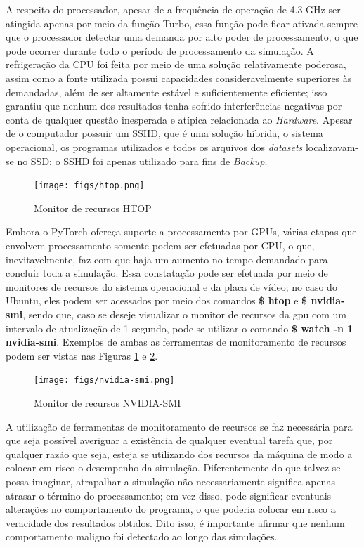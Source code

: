 A respeito do processador, apesar de a frequência de operação de 4.3 GHz ser atingida apenas por meio da função Turbo, essa função pode ficar ativada sempre que o processador detectar uma demanda por alto poder de processamento, o que pode ocorrer durante todo o período de processamento da simulação. A refrigeração da CPU foi feita por meio de uma solução relativamente poderosa, assim como a fonte utilizada possui capacidades consideravelmente superiores às demandadas, além de ser altamente estável e suficientemente eficiente; isso garantiu que nenhum dos resultados tenha sofrido interferências negativas por conta de qualquer questão inesperada e atípica relacionada ao \textit{Hardware}. Apesar de o computador possuir um SSHD, que é uma solução híbrida, o sistema operacional, os programas utilizados e todos os arquivos dos \textit{datasets} localizavam-se no SSD; o SSHD foi apenas utilizado para fins de \textit{Backup}.

\begin{figure}[H]
    \centering
    \texttt{[image: figs/htop.png]}
    \caption{Monitor de recursos HTOP}
    \label{fig:results_htop}
\end{figure}

Embora o PyTorch ofereça suporte a processamento por GPUs, várias etapas que envolvem processamento somente podem ser efetuadas por CPU, o que, inevitavelmente, faz com que haja um aumento no tempo demandado para concluir toda a simulação. Essa constatação pode ser efetuada por meio de monitores de recursos do sistema operacional e da placa de vídeo; no caso do Ubuntu, eles podem ser acessados por meio dos comandos \textbf{\$ htop} e \textbf{\$ nvidia-smi}, sendo que, caso se deseje visualizar o monitor de recursos da gpu com um intervalo de atualização de 1 segundo, pode-se utilizar o comando \textbf{\$ watch -n 1 nvidia-smi}. Exemplos de ambas as ferramentas de monitoramento de recursos podem ser vistas nas Figuras \ref{fig:results_htop} e \ref{fig:results_nvidia-smi}.


\begin{figure}[H]
    \centering
    \texttt{[image: figs/nvidia-smi.png]}
    \caption{Monitor de recursos NVIDIA-SMI}
    \label{fig:results_nvidia-smi}
\end{figure}


A utilização de ferramentas de monitoramento de recursos se faz necessária para que seja possível averiguar a existência de qualquer eventual tarefa que, por qualquer razão que seja, esteja se utilizando dos recursos da máquina de modo a colocar em risco o desempenho da simulação. Diferentemente do que talvez se possa imaginar, atrapalhar a simulação não necessariamente significa apenas atrasar o término do processamento; em vez disso, pode significar eventuais alterações no comportamento do programa, o que poderia colocar em risco a veracidade dos resultados obtidos. Dito isso, é importante afirmar que nenhum comportamento maligno foi detectado ao longo das simulações.



